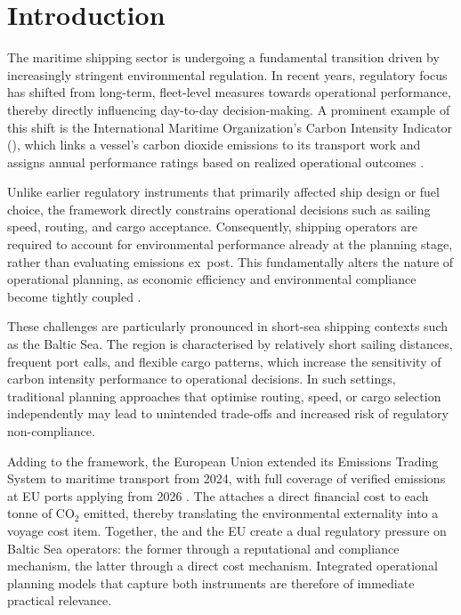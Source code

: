 \section{Introduction}
\label{ch:introduction}

The maritime shipping sector is undergoing a fundamental transition driven by
increasingly stringent environmental regulation. In recent years, regulatory
focus has shifted from long-term, fleet-level measures towards operational
performance, thereby directly influencing day-to-day decision-making. A
prominent example of this shift is the International Maritime Organization's
Carbon Intensity Indicator (\CII{}), which links a vessel's carbon dioxide
emissions to its transport work and assigns annual performance ratings based
on realized operational outcomes \parencite{imo2021cii}.

Unlike earlier regulatory instruments that primarily affected ship design or
fuel choice, the \CII{} framework directly constrains operational decisions
such as sailing speed, routing, and cargo acceptance. Consequently, shipping
operators are required to account for environmental performance already at the
planning stage, rather than evaluating emissions ex~post. This fundamentally
alters the nature of operational planning, as economic efficiency and
environmental compliance become tightly coupled \parencite{psaraftis2013speed}.

These challenges are particularly pronounced in short-sea shipping contexts
such as the Baltic Sea. The region is characterised by relatively short
sailing distances, frequent port calls, and flexible cargo patterns, which
increase the sensitivity of carbon intensity performance to operational
decisions. In such settings, traditional planning approaches that optimise
routing, speed, or cargo selection independently may lead to unintended
trade-offs and increased risk of regulatory non-compliance.

Adding to the \CII{} framework, the European Union extended its Emissions
Trading System to maritime transport from 2024, with full coverage of verified
emissions at EU ports applying from 2026 \parencite{eu_ets_shipping}.  The
\ETS{} attaches a direct financial cost to each tonne of CO$_2$ emitted, thereby
translating the environmental externality into a voyage cost item.  Together,
the \IMO{} \CII{} and the EU \ETS{} create a dual regulatory pressure on
Baltic Sea operators: the former through a reputational and compliance
mechanism, the latter through a direct cost mechanism.  Integrated operational
planning models that capture both instruments are therefore of immediate
practical relevance.

